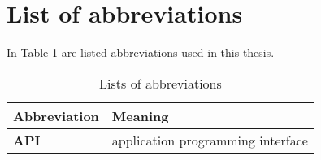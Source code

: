 \section{List of abbreviations}\label{ape:abbreviations}

In Table \ref{table:abbreviations} are listed abbreviations used in this thesis.

\begin{table}[!htb]
\centering
\begin{tabular}{ll}
\textbf{Abbreviation} & \textbf{Meaning} \\
\hline
\textbf{API} & application programming interface \\
\hline
\end{tabular}
\caption{Lists of abbreviations}
\label{table:abbreviations}
\end{table}